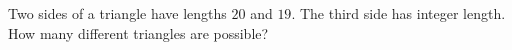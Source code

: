 Two sides of a triangle have lengths $20$ and $19$. The third side has integer length. How many different triangles are possible?
